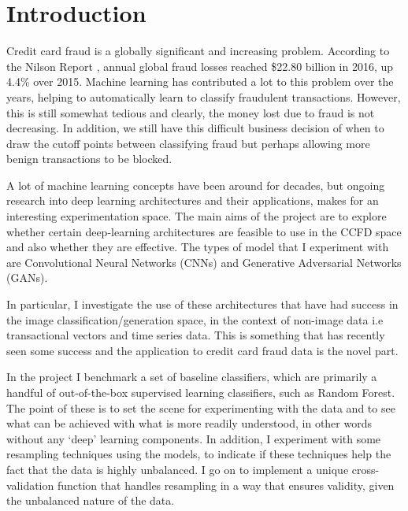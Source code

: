 \documentclass[12pt,a4paper,twoside]{report}
\begin{document}
\tableofcontents

\pagestyle{headings} 

\chapter{Introduction}

Credit card fraud is a globally significant and increasing problem. According to the Nilson Report \cite{nilsonreport}, annual global fraud losses reached \$22.80 billion in 2016, up 4.4\% over 2015. Machine learning has contributed a lot to this problem over the years, helping to automatically learn to classify fraudulent transactions. However, this is still somewhat tedious and clearly, the money lost due to fraud is not decreasing. In addition, we still have this difficult business decision of when to draw the cutoff points between classifying fraud but perhaps allowing more benign transactions to be blocked.

A lot of machine learning concepts have been around for decades, but ongoing research into deep learning architectures and their applications, makes for an interesting experimentation space. The main aims of the project are to explore whether certain deep-learning architectures are feasible to use in the CCFD space and also whether they are effective. The types of model that I experiment with are Convolutional Neural Networks (CNNs) \cite{DBLP:journals/corr/SimonyanZ14a} and Generative Adversarial Networks (GANs)\cite{2014arXiv1406.2661G}.

In particular, I investigate the use of these architectures that have had success in the image classification/generation space, in the context of non-image data i.e transactional vectors and time series data. This is something that has recently seen some success\cite{DBLP:journals/corr/OordDZSVGKSK16}\cite{wang2017time} and the application to credit card fraud data is the novel part.

In the project I benchmark a set of baseline classifiers, which are primarily a handful of out-of-the-box supervised learning classifiers, such as Random Forest. The point of these is to set the scene for experimenting with the data and to see what can be achieved with what is more readily understood, in other words without any `deep' learning components. In addition, I experiment with some resampling techniques using the models, to indicate if these techniques help the fact that the data is highly unbalanced. I go on to implement a unique cross-validation function that handles resampling in a way that ensures validity, given the unbalanced nature of the data.
\end{document}
